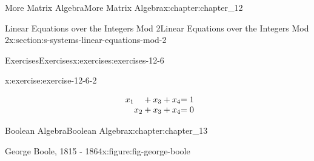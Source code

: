 \documentclass[oneside,10pt,]{book}
\numberwithin{equation}{section}
\begin{document}
\begin{chapterptx}{More Matrix Algebra}{}{More Matrix Algebra}{}{}{x:chapter:chapter_12}
\begin{sectionptx}{Linear Equations over the Integers Mod 2}{}{Linear Equations over the Integers Mod 2}{}{}{x:section:s-systems-linear-equations-mod-2}
\begin{exercises-subsection}{Exercises}{}{Exercises}{}{}{x:exercises:exercises-12-6}
\begin{divisionexercise}{3}{}{}{x:exercise:exercise-12-6-2}
\begin{enumerate}[label=(\alph*)]
\begin{equation*}
\begin{array}{r@{}r@{}r@{}r@{}r@{}r@{}r@{}r@{}r@{}r@{}}
x_1 &       &    & {}+{} &x_3 &{}+{} & x_4 &      &    &= 1 \\
&       & x_2   & {}+{} &x_3 &{}+{} & x_4 &      &    &= 0 \\
\end{array}
\end{equation*}
%
\end{enumerate}
%
\end{divisionexercise}%
\end{exercises-subsection}
\end{sectionptx}
\end{chapterptx}
%
%
\typeout{************************************************}
\typeout{************************************************}
%
\begin{chapterptx}{Boolean Algebra}{}{Boolean Algebra}{}{}{x:chapter:chapter_13}
\begin{introduction}{}%
\begin{figureptx}{George Boole, 1815 - 1864}{x:figure:fig-george-boole}{}%
\begin{image}{0}{1}{0}%

\end{image}
\end{figureptx}
\end{introduction}
\end{chapterptx}
\end{document}
